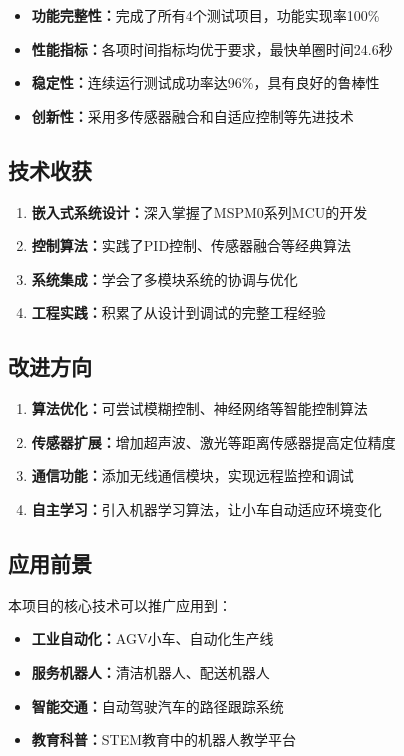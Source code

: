 \documentclass[UTF8]{ctexart}
\begin{document}
\begin{itemize}
    \item \textbf{功能完整性：}完成了所有4个测试项目，功能实现率100\%
    \item \textbf{性能指标：}各项时间指标均优于要求，最快单圈时间24.6秒
    \item \textbf{稳定性：}连续运行测试成功率达96\%，具有良好的鲁棒性
    \item \textbf{创新性：}采用多传感器融合和自适应控制等先进技术
\end{itemize}

\subsection{技术收获}

\begin{enumerate}
    \item \textbf{嵌入式系统设计：}深入掌握了MSPM0系列MCU的开发
    \item \textbf{控制算法：}实践了PID控制、传感器融合等经典算法
    \item \textbf{系统集成：}学会了多模块系统的协调与优化
    \item \textbf{工程实践：}积累了从设计到调试的完整工程经验
\end{enumerate}

\subsection{改进方向}

\begin{enumerate}
    \item \textbf{算法优化：}可尝试模糊控制、神经网络等智能控制算法
    \item \textbf{传感器扩展：}增加超声波、激光等距离传感器提高定位精度
    \item \textbf{通信功能：}添加无线通信模块，实现远程监控和调试
    \item \textbf{自主学习：}引入机器学习算法，让小车自动适应环境变化
\end{enumerate}

\subsection{应用前景}

本项目的核心技术可以推广应用到：

\begin{itemize}
    \item \textbf{工业自动化：}AGV小车、自动化生产线
    \item \textbf{服务机器人：}清洁机器人、配送机器人
    \item \textbf{智能交通：}自动驾驶汽车的路径跟踪系统
    \item \textbf{教育科普：}STEM教育中的机器人教学平台
\end{itemize}
\end{document}
